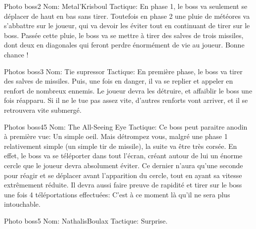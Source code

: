 Photo boss2   Nom: Metal'Krisboul
				Tactique: En phase 1, le boss va seulement se déplacer de haut en bas sans tirer. Toutefois en phase 2 une pluie de météores va s'abbattre sur le joueur, qui va devoir les éviter tout en continuant de tirer sur le boss. Passée cette pluie, le boss va se mettre à tirer des salves de trois missiles, dont deux en diagonales qui feront perdre énormément de vie au joueur. Bonne chance !
				
Photos boss3  Nom: Tie supressor
				Tactique: En première phase, le boss va tirer des salves de missiles. Puis, une fois en danger, il va se replier et appeler en renfort de nombreux ennemis. Le joueur devra les détruire, et affaiblir le boss une fois réapparu. Si il ne le tue pas assez vite, d'autres renforts vont arriver, et il se retrouvera vite submergé.
				
Photos boss45 Nom: The All-Seeing Eye
				Tactique: Ce boss peut paraitre anodin à première vue: Un simple oeil. Mais détrompez vous, malgré une phase 1 relativement simple (un simple tir de missile), la suite va être très corsée. En effet, le boss va se téléporter dans tout l'écran, créant autour de lui un énorme cercle que le joueur devra absolument éviter. Ce dernier n'aura qu'une seconde pour réagir et se déplacer avant l'apparition du cercle, tout en ayant sa vitesse extrêmement réduite. Il devra aussi faire preuve de rapidité et tirer sur le boss une fois 4 téléportations effectuées: C'est à ce moment là qu'il ne sera plus intouchable.
				
Photo boss5   Nom: NathalisBoulax
				Tactique: Surprise.